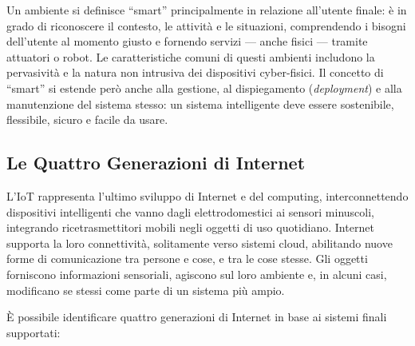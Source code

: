 \documentclass[
  italian,
  openany]{book}
\begin{document}
Un ambiente si definisce ``smart'' principalmente in relazione
all'utente finale: è in grado di riconoscere il contesto, le attività e
le situazioni, comprendendo i bisogni dell'utente al momento giusto e
fornendo servizi --- anche fisici --- tramite attuatori o robot. Le
caratteristiche comuni di questi ambienti includono la pervasività e la
natura non intrusiva dei dispositivi cyber-fisici. Il concetto di
``smart'' si estende però anche alla gestione, al dispiegamento
(\emph{deployment}) e alla manutenzione del sistema stesso: un sistema
intelligente deve essere sostenibile, flessibile, sicuro e facile da
usare.

\subsection{Le Quattro Generazioni di
Internet}\label{le-quattro-generazioni-di-internet}

L'IoT rappresenta l'ultimo sviluppo di Internet e del computing,
interconnettendo dispositivi intelligenti che vanno dagli
elettrodomestici ai sensori minuscoli, integrando ricetrasmettitori
mobili negli oggetti di uso quotidiano. Internet supporta la loro
connettività, solitamente verso sistemi cloud, abilitando nuove forme di
comunicazione tra persone e cose, e tra le cose stesse. Gli oggetti
forniscono informazioni sensoriali, agiscono sul loro ambiente e, in
alcuni casi, modificano se stessi come parte di un sistema più ampio.

È possibile identificare quattro generazioni di Internet in base ai
sistemi finali supportati:
\end{document}
